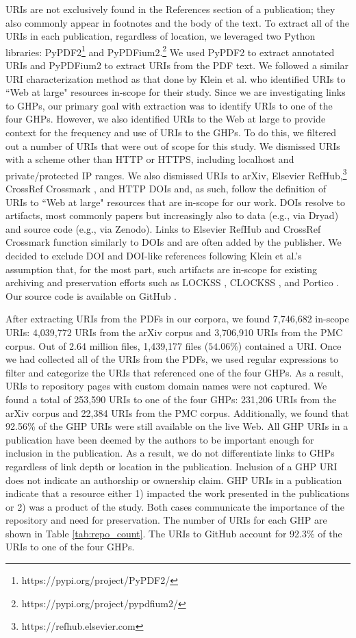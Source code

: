 URIs are not exclusively found in the References section of a publication; they also commonly appear in footnotes and the body of the text. To extract all of the URIs in each publication, regardless of location, we leveraged two Python libraries: PyPDF2\footnote{https://pypi.org/project/PyPDF2/} and PyPDFium2.\footnote{https://pypi.org/project/pypdfium2/} We used PyPDF2 to extract annotated URIs and PyPDFium2 to extract URIs from the PDF text. We followed a similar URI characterization method as that done by Klein et al. \cite{klein-plos2014} who identified URIs to ``Web at large" resources in-scope for their study. Since we are investigating links to GHPs, our primary goal with extraction was to identify URIs to one of the four GHPs. However, we also identified URIs to the Web at large to provide context for the frequency and use of URIs to the GHPs. To do this, we filtered out a number of URIs that were out of scope for this study. We dismissed URIs with a scheme other than HTTP or HTTPS, including localhost and private/protected IP ranges. We also dismissed URIs to arXiv, Elsevier RefHub,\footnote{https://refhub.elsevier.com} CrossRef Crossmark \cite{hendricks-crossref-2020}, and HTTP DOIs and, as such, follow the definition of URIs to ``Web at large" resources that are in-scope for our work. DOIs resolve to artifacts, most commonly papers but increasingly also to data (e.g., via Dryad) and source code (e.g., via Zenodo). Links to Elsevier RefHub and CrossRef Crossmark function similarly to DOIs and are often added by the publisher. We decided to exclude DOI and DOI-like references following Klein et al.'s assumption that, for the most part, such artifacts are in-scope for existing archiving and preservation efforts such as LOCKSS \cite{reich-dlib2001}, CLOCKSS \cite{reich-serials2008}, and Portico \cite{fenton-serials2006}. Our source code is available on GitHub \cite{Extract-URLs}.

After extracting URIs from the PDFs in our corpora, we found 7,746,682 in-scope URIs: 4,039,772 URIs from the arXiv corpus and 3,706,910 URIs from the PMC corpus. Out of 2.64 million files, 1,439,177 files ($54.06\%$) contained a URI. Once we had collected all of the URIs from the PDFs, we used regular expressions to filter and categorize the URIs that referenced one of the four GHPs. As a result, URIs to repository pages with custom domain names \cite{custom-domain} were not captured. We found a total of 253,590 URIs to one of the four GHPs: 231,206 URIs from the arXiv corpus and 22,384 URIs from the PMC corpus. Additionally, we found that 92.56\% of the GHP URIs were still available on the live Web. All GHP URIs in a publication have been deemed by the authors to be important enough for inclusion in the publication. As a result, we do not differentiate links to GHPs regardless of link depth or location in the publication. Inclusion of a GHP URI does not indicate an authorship or ownership claim. GHP URIs in a publication indicate that a resource either 1) impacted the work presented in the publications or 2) was a product of the study. Both cases communicate the importance of the repository and need for preservation. The number of URIs for each GHP are shown in Table \ref{tab:repo_count}. The URIs to GitHub account for 92.3\% of the URIs to one of the four GHPs. 

